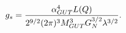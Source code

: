 \begin{equation}\label{gst}
g_s={\alpha_{GUT}^4 L(Q)\over
2^{9/2}(2\pi)^3M_{GUT}^3G_N^{3/2}\lambda^{3/2}}.
\end{equation}


